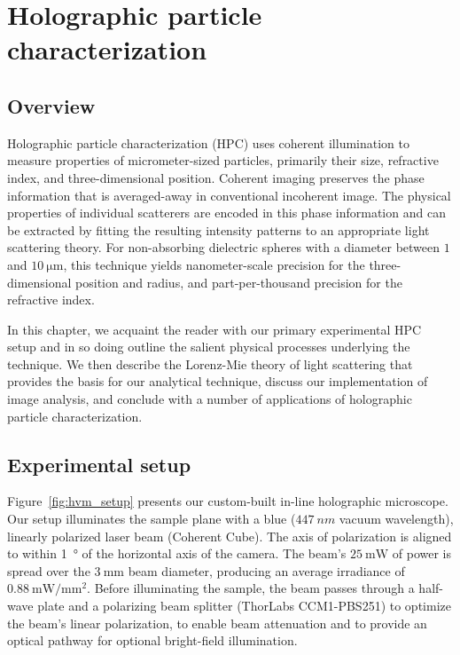 \chapter{Holographic particle characterization}
\label{ch:hvm}

\newcommand{\einc}{\vec{E}_{\text{inc}}}
\newcommand{\escat}{\vec{E}_{\text{s}}}
\newcommand{\eadd}{\vec{E}_{\text{add}}}

\section{Overview}

Holographic particle characterization (HPC) uses coherent
illumination to measure properties of micrometer-sized particles,
primarily their size, refractive index, and three-dimensional position.
Coherent imaging preserves the phase information that is averaged-away
in conventional incoherent image. The physical properties of individual
scatterers are encoded in this phase information and can be extracted by fitting
the resulting intensity patterns to an appropriate light scattering theory.
For non-absorbing dielectric spheres with a diameter between $\num{1}$ and $\SI{10}{\um}$,
this technique yields nanometer-scale precision for the three-dimensional
position and radius, and part-per-thousand precision for the refractive
index\cite{krishnatreya14}.

In this chapter, we acquaint the reader with our primary experimental
HPC setup and in so doing outline the salient physical processes underlying
the technique. We then describe the Lorenz-Mie theory of light
scattering that provides the basis for our analytical technique,
discuss our implementation of image analysis, and 
conclude with a number of applications of holographic particle
characterization.

\section{Experimental setup}
\label{ch:hvm:sec:hvm}

Figure~\ref{fig:hvm_setup} presents our custom-built in-line holographic
microscope. Our setup illuminates the sample plane with a blue
($\SI{447}{nm}$ vacuum wavelength), linearly polarized laser beam
(Coherent Cube). The axis of polarization is aligned to within
\SI{1}{\degree} of the horizontal axis of the camera. 
The beam's $\SI{25}{\mW}$ of power is spread over
the $\SI{3}{\mm}$ beam diameter, producing an average irradiance
of $\SI{0.88}{\mW / \mm^2}$. Before illuminating the sample, the beam
passes through a half-wave plate and a polarizing beam splitter
(ThorLabs CCM1-PBS251) to optimize the beam's linear polarization, to
enable beam attenuation and to provide an optical pathway for
optional bright-field illumination.


